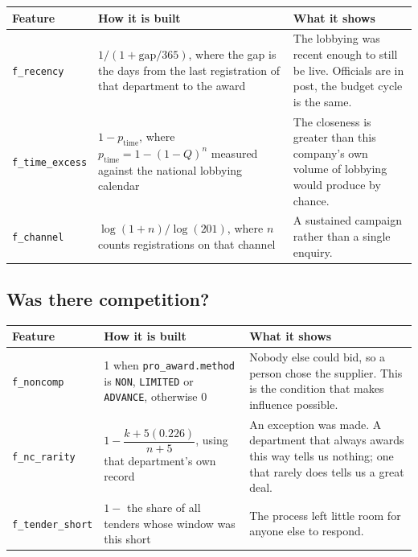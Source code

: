 \documentclass[11pt,a4paper]{article}
\begin{document}
\begin{center}\small
\begin{tabular}{@{}p{2.6cm}p{5.6cm}p{6.7cm}@{}}
\toprule
\textbf{Feature} & \textbf{How it is built} & \textbf{What it shows} \\
\midrule
\texttt{f\_recency} &
  $1/(1+\text{gap}/365)$, where the gap is the days from the last registration of that
  department to the award &
  The lobbying was recent enough to still be live. Officials are in post, the budget
  cycle is the same. \\
\texttt{f\_time\_excess} &
  $1-p_{\text{time}}$, where
  $p_{\text{time}} = 1-(1-Q)^{n}$ measured against the national lobbying calendar &
  The closeness is greater than this company's own volume of lobbying would produce
  by chance. \\
\texttt{f\_channel} &
  $\log(1+n)/\log(201)$, where $n$ counts registrations on that channel &
  A sustained campaign rather than a single enquiry. \\
\bottomrule
\end{tabular}
\end{center}

\subsection*{Was there competition?}

\begin{center}\small
\begin{tabular}{@{}p{2.6cm}p{5.6cm}p{6.7cm}@{}}
\toprule
\textbf{Feature} & \textbf{How it is built} & \textbf{What it shows} \\
\midrule
\texttt{f\_noncomp} &
  1 when \texttt{pro\_award.method} is \texttt{NON}, \texttt{LIMITED} or
  \texttt{ADVANCE}, otherwise 0 &
  Nobody else could bid, so a person chose the supplier. This is the condition that
  makes influence possible. \\
\texttt{f\_nc\_rarity} &
  $1-\dfrac{k+5(0.226)}{n+5}$, using that department's own record &
  An exception was made. A department that always awards this way tells us nothing;
  one that rarely does tells us a great deal. \\
\texttt{f\_tender\_short} &
  $1-$ the share of all tenders whose window was this short &
  The process left little room for anyone else to respond. \\
\bottomrule
\end{tabular}
\end{center}
\end{document}
